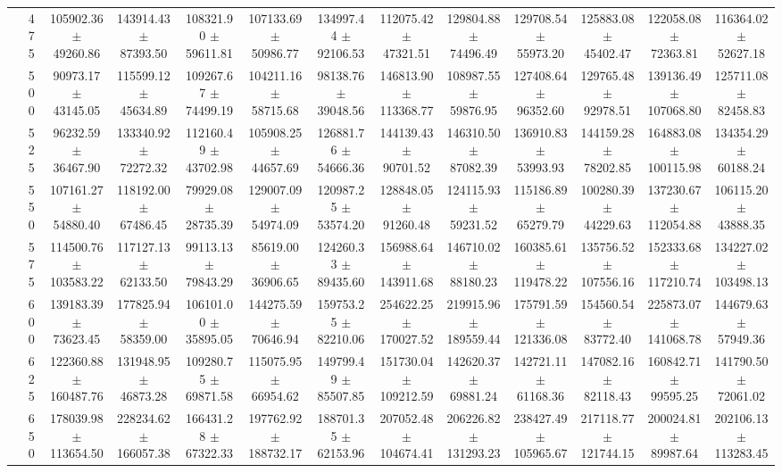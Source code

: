 \begin{table}[h]
{\begin{tabular}{
        ccccccccccccc}
 & 475& 105902.36 $\pm$ 49260.86& 143914.43 $\pm$ 87393.50& 108321.90 $\pm$ 59611.81& 107133.69 $\pm$ 50986.77& 134997.44 $\pm$ 92106.53& 112075.42 $\pm$ 47321.51& 129804.88 $\pm$ 74496.49& 129708.54 $\pm$ 55973.20& 125883.08 $\pm$ 45402.47& 122058.08 $\pm$ 72363.81& 116364.02 $\pm$ 52627.18 \\ 
 & 500& 90973.17 $\pm$ 43145.05& 115599.12 $\pm$ 45634.89& 109267.67 $\pm$ 74499.19& 104211.16 $\pm$ 58715.68& 98138.76 $\pm$ 39048.56& 146813.90 $\pm$ 113368.77& 108987.55 $\pm$ 59876.95& 127408.64 $\pm$ 96352.60& 129765.48 $\pm$ 92978.51& 139136.49 $\pm$ 107068.80& 125711.08 $\pm$ 82458.83 \\ 
 & 525& 96232.59 $\pm$ 36467.90& 133340.92 $\pm$ 72272.32& 112160.49 $\pm$ 43702.98& 105908.25 $\pm$ 44657.69& 126881.76 $\pm$ 54666.36& 144139.43 $\pm$ 90701.52& 146310.50 $\pm$ 87082.39& 136910.83 $\pm$ 53993.93& 144159.28 $\pm$ 78202.85& 164883.08 $\pm$ 100115.98& 134354.29 $\pm$ 60188.24 \\ 
 & 550& 107161.27 $\pm$ 54880.40& 118192.00 $\pm$ 67486.45& 79929.08 $\pm$ 28735.39& 129007.09 $\pm$ 54974.09& 120987.25 $\pm$ 53574.20& 128848.05 $\pm$ 91260.48& 124115.93 $\pm$ 59231.52& 115186.89 $\pm$ 65279.79& 100280.39 $\pm$ 44229.63& 137230.67 $\pm$ 112054.88& 106115.20 $\pm$ 43888.35 \\ 
 & 575& 114500.76 $\pm$ 103583.22& 117127.13 $\pm$ 62133.50& 99113.13 $\pm$ 79843.29& 85619.00 $\pm$ 36906.65& 124260.33 $\pm$ 89435.60& 156988.64 $\pm$ 143911.68& 146710.02 $\pm$ 88180.23& 160385.61 $\pm$ 119478.22& 135756.52 $\pm$ 107556.16& 152333.68 $\pm$ 117210.74& 134227.02 $\pm$ 103498.13 \\ 
 & 600& 139183.39 $\pm$ 73623.45& 177825.94 $\pm$ 58359.00& 106101.00 $\pm$ 35895.05& 144275.59 $\pm$ 70646.94& 159753.25 $\pm$ 82210.06& 254622.25 $\pm$ 170027.52& 219915.96 $\pm$ 189559.44& 175791.59 $\pm$ 121336.08& 154560.54 $\pm$ 83772.40& 225873.07 $\pm$ 141068.78& 144679.63 $\pm$ 57949.36 \\ 
 & 625& 122360.88 $\pm$ 160487.76& 131948.95 $\pm$ 46873.28& 109280.75 $\pm$ 69871.58& 115075.95 $\pm$ 66954.62& 149799.49 $\pm$ 85507.85& 151730.04 $\pm$ 109212.59& 142620.37 $\pm$ 69881.24& 142721.11 $\pm$ 61168.36& 147082.16 $\pm$ 82118.43& 160842.71 $\pm$ 99595.25& 141790.50 $\pm$ 72061.02 \\ 
 & 650& 178039.98 $\pm$ 113654.50& 228234.62 $\pm$ 166057.38& 166431.28 $\pm$ 67322.33& 197762.92 $\pm$ 188732.17& 188701.35 $\pm$ 62153.96& 207052.48 $\pm$ 104674.41& 206226.82 $\pm$ 131293.23& 238427.49 $\pm$ 105965.67& 217118.77 $\pm$ 121744.15& 200024.81 $\pm$ 89987.64& 202106.13 $\pm$ 113283.45 \\ \hline 

\end{tabular}}
\end{table}

